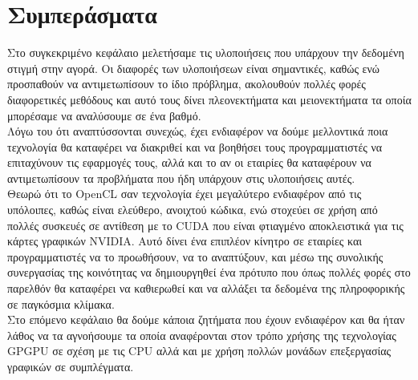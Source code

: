 \section{Συμπεράσματα}
Στο συγκεκριμένο κεφάλαιο μελετήσαμε τις υλοποιήσεις που υπάρχουν την δεδομένη στιγμή στην αγορά. Οι διαφορές των υλοποιήσεων είναι σημαντικές, καθώς ενώ προσπαθούν να αντιμετωπίσουν το ίδιο πρόβλημα, ακολουθούν πολλές φορές διαφορετικές μεθόδους και αυτό τους δίνει πλεονεκτήματα και μειονεκτήματα τα οποία μπορέσαμε να αναλύσουμε σε ένα βαθμό.\\

Λόγω του ότι αναπτύσσονται συνεχώς, έχει ενδιαφέρον να δούμε μελλοντικά ποια τεχνολογία θα καταφέρει να διακριθεί και να βοηθήσει τους προγραμματιστές να επιταχύνουν τις εφαρμογές τους, αλλά και το αν οι εταιρίες θα καταφέρουν να αντιμετωπίσουν τα προβλήματα που ήδη υπάρχουν στις υλοποιήσεις αυτές. \\

Θεωρώ ότι το OpenCL σαν τεχνολογία έχει μεγαλύτερο ενδιαφέρον από τις υπόλοιπες, καθώς είναι ελεύθερο, ανοιχτού κώδικα, ενώ στοχεύει σε χρήση από πολλές συσκευές σε αντίθεση με το CUDA που είναι φτιαγμένο αποκλειστικά για τις κάρτες γραφικών NVIDIA. Αυτό δίνει ένα επιπλέον κίνητρο σε εταιρίες και προγραμματιστές να το προωθήσουν, να το αναπτύξουν, και μέσω της συνολικής συνεργασίας της κοινότητας να δημιουργηθεί ένα πρότυπο που όπως πολλές φορές στο παρελθόν θα καταφέρει να καθιερωθεί και να αλλάξει τα δεδομένα της πληροφορικής σε παγκόσμια κλίμακα.\\

Στο επόμενο κεφάλαιο θα δούμε κάποια ζητήματα που έχουν ενδιαφέρον και θα ήταν λάθος να τα αγνοήσουμε τα οποία αναφέρονται στον τρόπο χρήσης της τεχνολογίας GPGPU σε σχέση με τις CPU αλλά και με χρήση πολλών μονάδων επεξεργασίας γραφικών σε συμπλέγματα.